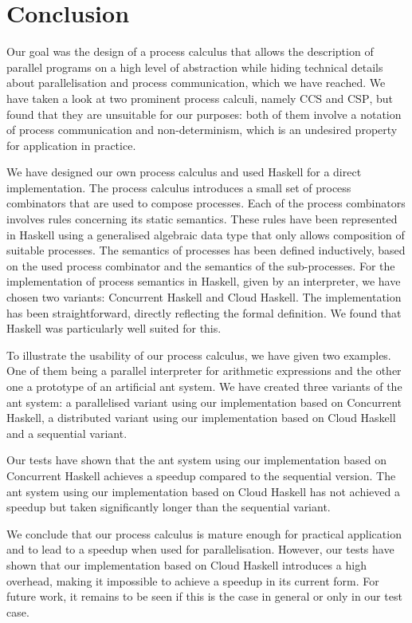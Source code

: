 \chapter{Conclusion}
\vspace*{-0.5em}
Our goal was the design of a process calculus that allows the description of parallel programs on a high level of abstraction while hiding technical details about parallelisation and process communication, which we have reached. We have taken a look at two prominent process calculi, namely \textsc{CCS} and \textsc{CSP}, but found that they are unsuitable for our purposes: both of them involve a notation of process communication and non-determinism, which is an undesired property for application in practice.

\vspace*{-0.25em}
We have designed our own process calculus and used \textsf{Haskell} for a direct implementation. The process calculus introduces a small set of process combinators that are used to compose processes. Each of the process combinators involves rules concerning its static semantics. These rules have been represented in \textsf{Haskell} using a generalised algebraic data type that only allows composition of suitable processes. The semantics of processes has been defined inductively, based on the used process combinator and the semantics of the sub-processes. For the implementation of process semantics in \textsf{Haskell}, given by an interpreter, we have chosen two variants: \textsf{Concurrent Haskell} and \textsf{Cloud Haskell}. The implementation has been straightforward, directly reflecting the formal definition. We found that \textsf{Haskell} was particularly well suited for this.

\vspace*{-0.25em}
To illustrate the usability of our process calculus, we have given two examples. One of them being a parallel interpreter for arithmetic expressions and the other one a prototype of an artificial ant system. We have created three variants of the ant system: a parallelised variant using our implementation based on \textsf{Concurrent Haskell}, a distributed variant using our implementation based on \textsf{Cloud Haskell} and a sequential variant.

\vspace*{-0.25em}
Our tests have shown that the ant system using our implementation based on \textsf{Concurrent Haskell} achieves a speedup compared to the sequential version. The ant system using our implementation based on \textsf{Cloud Haskell} has not achieved a speedup but taken significantly longer than the sequential variant. 

\vspace*{-0.25em}
We conclude that our process calculus is mature enough for practical application and to lead to a speedup when used for parallelisation. However, our tests have shown that our implementation based on \textsf{Cloud Haskell} introduces a high overhead, making it impossible to achieve a speedup in its current form. For future work, it remains to be seen if this is the case in general or only in our test case.
\vspace*{-0.5em}